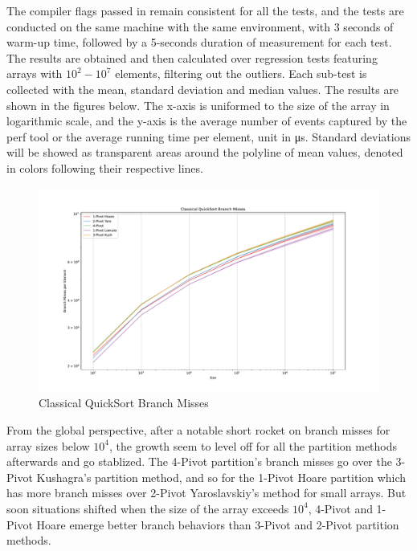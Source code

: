 \documentclass{article}
\begin{document}
The compiler flags passed in remain consistent for all the tests, and the tests are conducted on the same machine with the same environment,
with 3 seconds of warm-up time, followed by a 5-seconds duration of measurement for each test. The results are obtained and then calculated over regression tests featuring arrays with $10^2 - 10^7$ elements,
filtering out the outliers. Each sub-test is collected with the mean, standard deviation and median values. The results are shown in the figures below.
The x-axis is uniformed to the size of the array in logarithmic scale, and the y-axis is the average number of events captured by the perf tool or the average running time per element, unit in μs.
Standard deviations will be showed as transparent areas around the polyline of mean values, denoted in colors following their respective lines.
\begin{center}
\begin{figure}[H]
    \hypertarget{fig:classicalbranchmiss}{}
    \caption{Classical QuickSort Branch Misses}
    \centering
    \hspace*{-0.27\textwidth}
    \includegraphics[width=1.5\textwidth]{Classical QuickSort Branch Misses.pdf}
\end{figure}
\end{center}

From the global perspective, after a notable short rocket on branch misses for array sizes below $10^4$, the growth seem to level off for all the partition methods afterwards and go stablized. 
The 4-Pivot partition's branch misses go over the 3-Pivot Kushagra's partition method, and so for the 1-Pivot Hoare partition which has more branch misses over 2-Pivot Yaroslavskiy's method for small arrays.
But soon situations shifted when the size of the array exceeds $10^4$, 4-Pivot and 1-Pivot Hoare emerge better branch behaviors than 3-Pivot and 2-Pivot partition methods.
\end{document}
